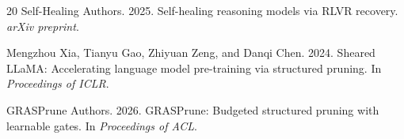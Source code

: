 \documentclass[11pt,a4paper]{article}
\begin{document}
\begin{thebibliography}{20}
Self-Healing Authors. 2025.
\newblock Self-healing reasoning models via RLVR recovery.
\newblock \emph{arXiv preprint}.

Mengzhou Xia, Tianyu Gao, Zhiyuan Zeng, and Danqi Chen. 2024.
\newblock Sheared LLaMA: Accelerating language model pre-training via structured pruning.
\newblock In \emph{Proceedings of ICLR}.

GRASPrune Authors. 2026.
\newblock GRASPrune: Budgeted structured pruning with learnable gates.
\newblock In \emph{Proceedings of ACL}.

\end{thebibliography}
\end{document}
